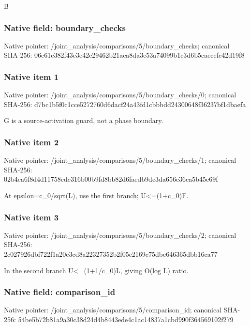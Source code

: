 \documentclass[10pt,a4paper]{article}
\begin{document}
\begingroup\raggedright\sloppy B\par\endgroup

\subsubsection{Native field: boundary\_\allowbreak{}checks}
Native pointer: /joint\_\allowbreak{}analysis/comparisons/5/boundary\_\allowbreak{}checks; canonical SHA-256: 06e61c382f43e3e42e29462b21aca8da3e53a74099b1c3d6b5caecefc42d19f8

\subsubsection{Native item 1}
Native pointer: /joint\_\allowbreak{}analysis/comparisons/5/boundary\_\allowbreak{}checks/0; canonical SHA-256: d7bc1b5f0c1cce5272760d6dacf24a43fd1cbbbdd24300648f36237bf1dbaefa

\begingroup\raggedright\sloppy G is a source-activation guard,\allowbreak{} not a phase boundary.\par\endgroup

\subsubsection{Native item 2}
Native pointer: /joint\_\allowbreak{}analysis/comparisons/5/boundary\_\allowbreak{}checks/1; canonical SHA-256: 02b4ea6f8d4d11758ede316b00b9fd8bb82d6faedb9dc3da656c36ca5b45c69f

\begingroup\raggedright\sloppy At epsilon=\allowbreak{}c\_\allowbreak{}0/\allowbreak{}sqrt(L),\allowbreak{} use the first branch;\allowbreak{} U<=\allowbreak{}(1+c\_\allowbreak{}0)F.\par\endgroup

\subsubsection{Native item 3}
Native pointer: /joint\_\allowbreak{}analysis/comparisons/5/boundary\_\allowbreak{}checks/2; canonical SHA-256: 2c027926dbf722f1a20c3cd8a22327352b2f05e2169c75dbe646365dbb16ca77

\begingroup\raggedright\sloppy In the second branch U<=\allowbreak{}(1+1/\allowbreak{}c\_\allowbreak{}0)L,\allowbreak{} giving O(log L) ratio.\par\endgroup

\subsubsection{Native field: comparison\_\allowbreak{}id}
Native pointer: /joint\_\allowbreak{}analysis/comparisons/5/comparison\_\allowbreak{}id; canonical SHA-256: 54be5b72b81a9a30c38d24d4b8443ede4c1ac14837a1cbd990f364569102f279
\end{document}
